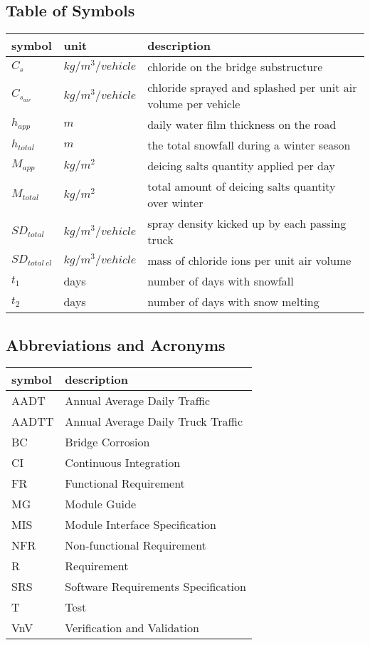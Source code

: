 \documentclass[12pt, titlepage]{article}
\begin{document}
\subsection{Table of Symbols}
\noindent \begin{tabular}{l l p{12cm}} \toprule
\textbf{symbol} & \textbf{unit} & \textbf{description}\\
\midrule 
$C_s$ & $kg/m^3/vehicle$ & chloride on the bridge substructure\\
$C_{s_{air}}$ & $kg/m^3/vehicle$ & chloride sprayed and splashed per unit air volume per vehicle\\
$h_{app}$ & $m$ & daily water film thickness on the road\\
$h_{total}$ & $m$ & the total snowfall during a winter season\\
$M_{app}$ & $kg/m^2$ & deicing salts quantity applied per day\\
$M_{total}$ & $kg/m^2$ & total amount of deicing salts quantity over winter\\
$SD_{total}$ & $kg/m^{3}/vehicle$ & spray density kicked up by each passing truck\\
$SD_{total~cl}$ & $kg/m^3/vehicle$ & mass of chloride ions per unit air volume\\
$t_1$ & days & number of days with snowfall\\
$t_2$ & days & number of days with snow melting\\
\bottomrule
\end{tabular}



\subsection{Abbreviations and Acronyms}

\renewcommand{\arraystretch}{1.2}
\begin{tabular}{l l} 
  \toprule		
  \textbf{symbol} & \textbf{description}\\
  \midrule 

  AADT & Annual Average Daily Traffic\\
  AADTT & Annual Average Daily Truck Traffic \\
  BC & Bridge Corrosion\\
  CI & Continuous Integration\\
  FR & Functional Requirement\\
  MG & Module Guide\\
  MIS & Module Interface Specification\\
  NFR & Non-functional Requirement\\
  R & Requirement\\
  SRS & Software Requirements Specification\\
  T & Test\\
  VnV & Verification and Validation\\
  
  \bottomrule
\end{tabular}\\
\end{document}
